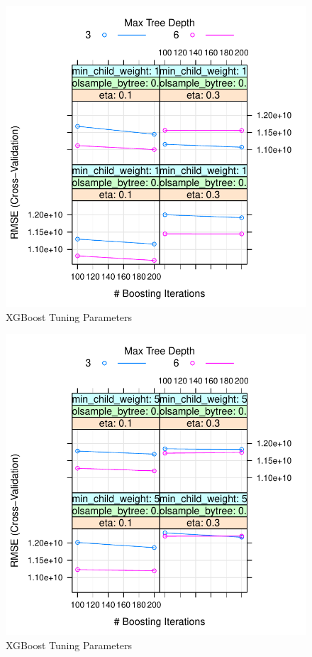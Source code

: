 \documentclass[11pt,]{article}
\begin{document}
\begin{figure}

{\centering \includegraphics{stock_analysis_files/figure-latex/XGBoost-2} 

}

\caption{XGBoost Tuning Parameters}\label{fig:XGBoost-2}
\end{figure}
\begin{figure}

{\centering \includegraphics{stock_analysis_files/figure-latex/XGBoost-3} 

}

\caption{XGBoost Tuning Parameters}\label{fig:XGBoost-3}
\end{figure}
\end{document}

